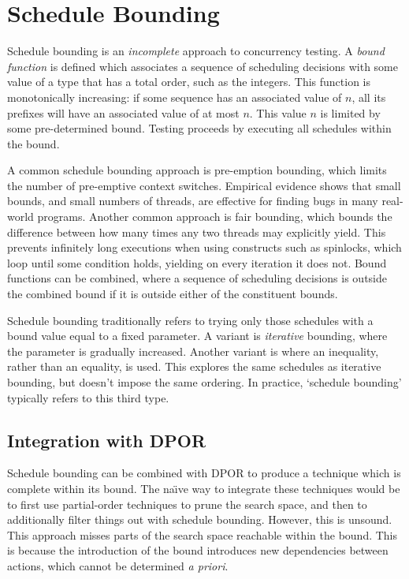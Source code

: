 \section{Schedule Bounding}
\label{sec:sct-bounding}

Schedule bounding\cite{emmi2011,musuvathi2008,musuvathi2007} is an
\emph{incomplete} approach to concurrency testing.  A \emph{bound function} is
defined which associates a sequence of scheduling decisions with some value of a
type that has a total order, such as the integers.  This function is
monotonically increasing: if some sequence has an associated value of $n$, all
its prefixes will have an associated value of at most $n$.  This value $n$ is
limited by some pre-determined bound.  Testing proceeds by executing all
schedules within the bound.

A common schedule bounding approach is pre-emption
bounding\cite{musuvathi2007}, which limits the number of pre-emptive
context switches.  Empirical evidence shows that small bounds, and
small numbers of threads, are effective for finding bugs in many
real-world programs\cite{thomson2014}.  Another common approach is
fair bounding\cite{musuvathi2008}, which bounds the difference between
how many times any two threads may explicitly yield.  This prevents
infinitely long executions when using constructs such as spinlocks,
which loop until some condition holds, yielding on every iteration it
does not.  Bound functions can be combined, where a sequence of
scheduling decisions is outside the combined bound if it is outside
either of the constituent bounds.

Schedule bounding traditionally refers to trying only those schedules
with a bound value equal to a fixed parameter.  A variant is
\emph{iterative} bounding, where the parameter is gradually
increased\cite{musuvathi2007}.  Another variant is where an
inequality, rather than an equality, is used.  This explores the same
schedules as iterative bounding, but doesn't impose the same ordering.
In practice, `schedule bounding' typically refers to this third type.

\subsection{Integration with DPOR}

Schedule bounding can be combined with DPOR to produce a technique which is
complete within its bound.  The na\"{\i}ve way to integrate these techniques
would be to first use partial-order techniques to prune the search space, and
then to additionally filter things out with schedule bounding.  However, this is
unsound.  This approach misses parts of the search space reachable within the
bound.  This is because the introduction of the bound introduces new
dependencies between actions, which cannot be determined \emph{a
  priori}\cite{coons2013}.

